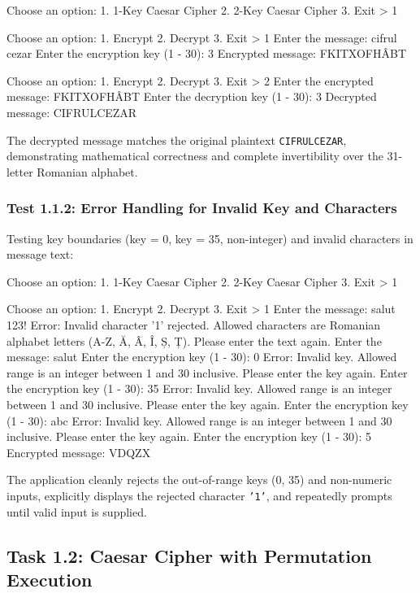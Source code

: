\documentclass[12pt,a4paper]{article}
\begin{document}
\begin{terminalwindow}
Choose an option: 
1. 1-Key Caesar Cipher
2. 2-Key Caesar Cipher
3. Exit
> 1

Choose an option: 
1. Encrypt
2. Decrypt
3. Exit
> 1
Enter the message: cifrul cezar
Enter the encryption key (1 - 30): 3
Encrypted message: FKITXOFHÂBT

Choose an option: 
1. Encrypt
2. Decrypt
3. Exit
> 2
Enter the encrypted message: FKITXOFHÂBT
Enter the decryption key (1 - 30): 3
Decrypted message: CIFRULCEZAR
\end{terminalwindow}

The decrypted message matches the original plaintext \texttt{CIFRULCEZAR}, demonstrating mathematical correctness and complete invertibility over the 31-letter Romanian alphabet.

\subsubsection{Test 1.1.2: Error Handling for Invalid Key and Characters}
Testing key boundaries (key = 0, key = 35, non-integer) and invalid characters in message text:

\begin{terminalwindow}
Choose an option: 
1. 1-Key Caesar Cipher
2. 2-Key Caesar Cipher
3. Exit
> 1

Choose an option: 
1. Encrypt
2. Decrypt
3. Exit
> 1
Enter the message: salut 123!
Error: Invalid character '1' rejected. Allowed characters are Romanian alphabet letters (A-Z, Ă, Â, Î, Ș, Ț).
Please enter the text again.
Enter the message: salut
Enter the encryption key (1 - 30): 0
Error: Invalid key. Allowed range is an integer between 1 and 30 inclusive.
Please enter the key again.
Enter the encryption key (1 - 30): 35
Error: Invalid key. Allowed range is an integer between 1 and 30 inclusive.
Please enter the key again.
Enter the encryption key (1 - 30): abc
Error: Invalid key. Allowed range is an integer between 1 and 30 inclusive.
Please enter the key again.
Enter the encryption key (1 - 30): 5
Encrypted message: VDQZX
\end{terminalwindow}

The application cleanly rejects the out-of-range keys (0, 35) and non-numeric inputs, explicitly displays the rejected character \texttt{'1'}, and repeatedly prompts until valid input is supplied.

\subsection{Task 1.2: Caesar Cipher with Permutation Execution}
\end{document}
